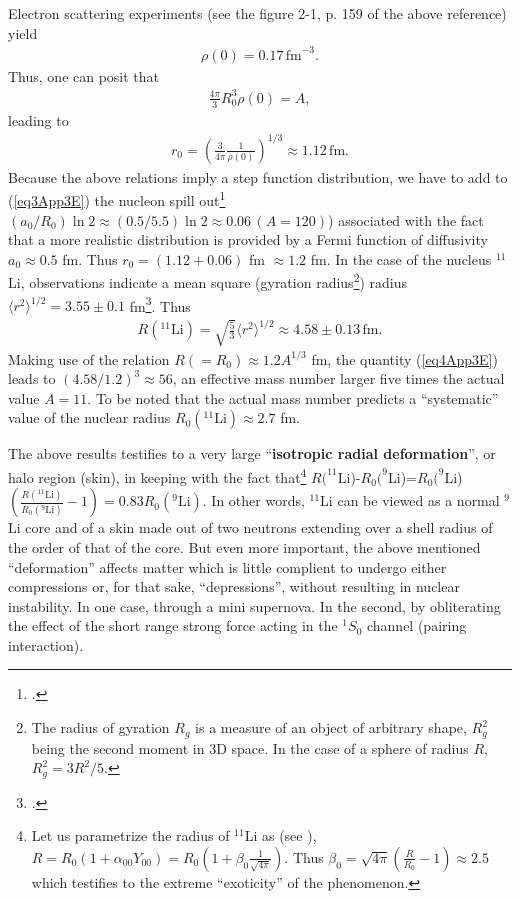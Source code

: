 \begin{subappendices}
Electron scattering experiments (see the figure 2-1, p. 159 of the above reference) yield
\begin{align}
\rho(0)=0.17\,\text{fm}^{-3}.
\end{align}
Thus, one can posit that
\begin{align}
\frac{4\pi}{3}R_0^3\rho(0)=A,
\end{align}
leading to
\begin{align}\label{eq3App3E}
r_0=\left(\frac{3}{4\pi}\frac{1}{\rho(0)}\right)^{1/3}\approx 1.12\,\text{fm}.
\end{align}
Because the above relations imply a step function distribution, we have to add to (\ref{eq3App3E}) the nucleon spill out\footnote{\cite{Bertsch:05}.} $(a_0/R_0)\ln 2\approx (0.5/5.5)\ln 2\approx 0.06\, (A=120)$) associated with the fact that a more realistic distribution is provided by a Fermi function of diffusivity $a_0\approx 0.5$ fm. Thus $r_0=(1.12+0.06)$ fm $\approx 1.2$ fm. In the case of the nucleus $^{11}$Li, observations indicate a mean square (gyration radius\footnote{The radius of gyration $R_g$ is a measure of an object of arbitrary shape, $R^2_g$ being the second moment in 3D space. In the case of a sphere of radius $R$, $R^2_g=3R^2/5$.}) radius $\langle r^2\rangle^{1/2}=3.55\pm 0.1$ fm\footnote{\cite{Kobayashi:89}.}. Thus
\begin{align}\label{eq4App3E}
R(^{11}\text{Li})=\sqrt{\frac{5}{3}}\langle r^2\rangle^{1/2}\approx 4.58\pm 0.13\,\text{fm}.
\end{align}
Making use of the relation $R(=R_0)\approx1.2 A^{1/3}$ fm, the quantity (\ref{eq4App3E}) leads to $(4.58/1.2)^3\approx56$, an effective mass number larger five times the actual value $A=11$. To be noted that the actual mass number predicts a ``systematic'' value of the nuclear radius $R_0(^{11}\text{Li})\approx 2.7$ fm.


The above results testifies to a very large ``\textbf{isotropic radial deformation}'', or halo region (skin), in keeping with the fact that\footnote{Let us  parametrize the radius of $^{11}$Li as (see \cite{Bohr:75}), $R=R_0(1+\alpha_{00}Y_{00})=R_0(1+\beta_{0}\frac{1}{\sqrt{4\pi}})$. Thus $\beta_0=\sqrt{4\pi}(\frac{R}{R_0}-1)\approx 2.5$ which testifies to the extreme ``exoticity'' of the phenomenon.} $R(^{11}$Li)-$R_0(^{9}$Li)=$R_0(^{9}$Li)$(\frac{R(^{11}\text{Li})}{R_0(^9\text{Li})}-1)=0.83R_0(^9\text{Li})$. In other words, $^{11}$Li can be viewed as a normal $^{9}$Li core and of a skin made out of two neutrons   extending over a shell radius of the order of that of the core. But even more important, the above mentioned ``deformation'' affects matter which is little complient to undergo either compressions or, for that sake, ``depressions'', without resulting in nuclear instability. In one case, through a mini supernova. In the second, by obliterating the effect of the short range strong force acting in the $^1S_0$ channel (pairing interaction).



\end{subappendices}
